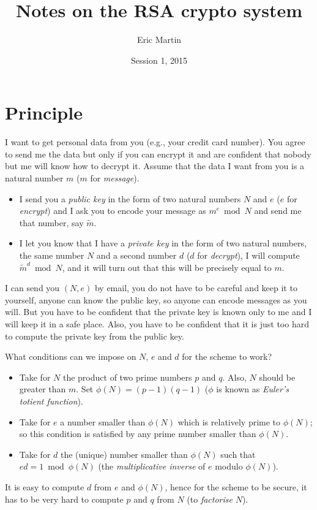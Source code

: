 \documentclass{amsart}
\begin{document}
\title{Notes on the RSA crypto system}
\author{Eric Martin}
\address{COMP9021 Principles of Programming}
\date{Session 1, 2015}

\maketitle
\thispagestyle{empty}

\section{Principle}

I want to get personal data from you (e.g., your credit card number). You agree to send me the data but only if you can encrypt it and are confident that nobody but me will know how to decrypt it. Assume that the data I want from you is a natural number $m$ ($m$ for \emph{message}).
%
\begin{itemize}
\item
I send you a \emph{public key} in the form of two natural numbers $N$ and $e$ ($e$ for \emph{encrypt}) and I ask you to encode your message as $m^e \bmod N$ and send me that number, say $\widetilde{m}$.
\item
I let you know that I have a \emph{private key} in the form of two natural numbers, the same number $N$ and a second number $d$ ($d$ for \emph{decrypt}), I will compute $\widetilde{m}^d \bmod N$, and it will turn out that this will be precisely equal to $m$.
\end{itemize}
%
I can send you $(N, e)$ by email, you do not have to be careful and keep it to yourself, anyone can know the public key, so anyone can encode messages as you will. But you have to be confident that the private key is known only to me and I will keep it in a safe place. Also, you have to be confident that it is just too hard to compute the private key from the public key.

What conditions can we impose on $N$, $e$ and $d$ for the scheme to work?
%
\begin{itemize}
\item
Take for $N$ the product of two prime numbers $p$ and $q$. Also, $N$ should be greater than $m$. Set $\phi(N)=(p-1)(q-1)$ ($\phi$ is known as \emph{Euler's totient function}).
\item
Take for $e$ a number smaller than $\phi(N)$ which is relatively prime to $\phi(N)$; so this condition is satisfied by any prime number smaller than $\phi(N)$.
\item
Take for $d$ the (unique) number smaller than $\phi(N)$ such that $ed = 1\bmod\phi(N)$ (the \emph{multiplicative inverse} of $e$ modulo $\phi(N)$).
\end{itemize}
%
It is easy to compute $d$ from $e$ and $\phi(N)$, hence for the scheme to be secure, it has to be very hard to compute $p$ and $q$ from $N$ (to \emph{factorise} $N$).
\end{document}
